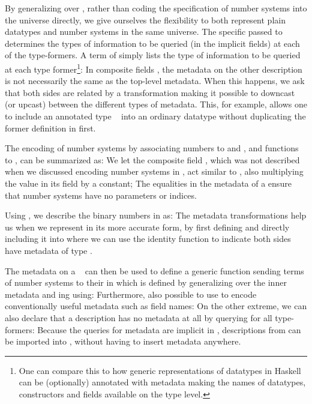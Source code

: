 By generalizing  over , rather than coding the specification of number systems into the universe directly, we give ourselves the flexibility to both represent plain datatypes and number systems in the same universe. The specific  passed to  determines the types of information to be queried (in the implicit  fields) at each of the type-formers. A term of  simply lists the type of information to be queried at each type former\footnote{One can compare this to how generic representations of datatypes in Haskell can be (optionally) annotated with metadata making the names of datatypes, constructors and fields available on the type level.}:
In composite fields , the metadata on the other description is not necessarily the same as the top-level metadata. When this happens, we ask that both sides are related by a transformation
making it possible to downcast (or upcast) between the different types of metadata. This, for example, allows one to include an annotated type \  into an ordinary datatype  without duplicating the former definition in  first.

The encoding of number systems by associating numbers to  and , and functions to , can be summarized as:
We let the composite field , which was not described when we discussed encoding number systems in , act similar to , also multiplying the value in its field by a constant; The equalities in the metadata of a  ensure that number systems have no parameters or indices. 

Using , we describe the binary numbers  in  as:
The metadata transformations help us when we represent  in its more accurate form, by first defining 
and directly including it into 
where we can use the identity function to indicate both sides have metadata of type .

The metadata on a \  can then be used to define a generic function sending terms of number systems to their  in \bN{}
which is defined by generalizing over the inner metadata and ing using:
Furthermore, also possible to use  to encode conventionally useful metadata such as field names:
On the other extreme, we can also declare that a description has no metadata at all by querying  for all type-formers:
Because the queries for metadata are implicit in , descriptions from  can be imported into , without having to insert metadata anywhere.
